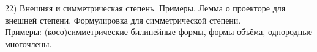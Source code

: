 22) Внешняя и симметрическая степень. Примеры. Лемма о проекторе для внешней степени. Формулировка для симметрической степени.\\
Примеры: (косо)симметрические билинейные формы, формы объёма, однородные многочлены.\\
